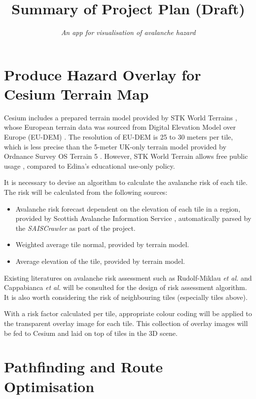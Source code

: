 \documentclass[11pt, oneside]{article}
\title{\vspace{-1.6cm}Summary of Project Plan (Draft)}
\author{\textit{An app for visualisation of avalanche hazard}}
\date{}
\begin{document}
\maketitle

\section{Produce Hazard Overlay for Cesium Terrain Map}
Cesium includes a prepared terrain model provided by STK World Terrains \cite{stk-world-terrain}, whose European terrain data was sourced from Digital Elevation Model over Europe (EU-DEM) \cite{eu-dem}. The resolution of EU-DEM is 25 to 30 meters per tile, which is less precise than the 5-meter UK-only terrain model provided by Ordnance Survey OS Terrain 5 \cite{os-5}. However, STK World Terrain allows free public usage \cite{stk-world-terrain}, compared to Edina's educational use-only policy.

It is necessary to devise an algorithm to calculate the avalanche risk of each tile. The risk will be calculated from the following sources:
\begin{itemize}
  \item Avalanche risk forecast dependent on the elevation of each tile in a region, provided by Scottish Avalanche Information Service \cite{sais}, automatically parsed by the \textit{SAISCrawler} as part of the project.
  \item Weighted average tile normal, provided by terrain model.
  \item Average elevation of the tile, provided by terrain model.
\end{itemize}

Existing literatures on avalanche risk assessment such as Rudolf-Miklau \textit{et al.} \cite{91097820150101} and Cappabianca \textit{et al.} \cite{Cappabianca2008193} will be consulted for the design of risk assessment algorithm. It is also worth considering the risk of neighbouring tiles (especially tiles above).

With a risk factor calculated per tile, appropriate colour coding \cite{macdonald1999using} will be applied to the transparent overlay image for each tile. This collection of overlay images will be fed to Cesium and laid on top of tiles in the 3D scene.

\section{Pathfinding and Route Optimisation}
\end{document}

